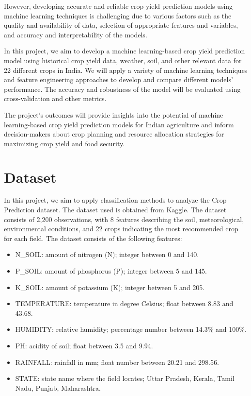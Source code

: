 \documentclass{article}
\begin{document}
However, developing accurate and reliable crop yield prediction models using machine learning techniques is challenging due to various factors such as the quality and availability of data, selection of appropriate features and variables, and accuracy and interpretability of the models.

In this project, we aim to develop a machine learning-based crop yield prediction model using historical crop yield data, weather, soil, and other relevant data for 22 different crops in India. We will apply a variety of machine learning techniques and feature engineering approaches to develop and compare different models' performance. The accuracy and robustness of the model will be evaluated using cross-validation and other metrics.

The project's outcomes will provide insights into the potential of machine learning-based crop yield prediction models for Indian agriculture and inform decision-makers about crop planning and resource allocation strategies for maximizing crop yield and food security.

\section{Dataset}

In this project, we aim to apply classification methods to analyze the Crop Prediction dataset. The dataset used is obtained from Kaggle. The dataset consists of 2,200 observations, with 8 features describing the soil, meteorological, environmental conditions, and 22 crops indicating the most recommended crop for each field. The dataset consists of the following features:

\begin{itemize}

\item N\_SOIL: amount of nitrogen (N); integer between 0 and 140.
\item P\_SOIL: amount of phosphorus (P); integer between 5 and 145.
\item K\_SOIL: amount of potassium (K); integer between 5 and 205.
\item TEMPERATURE: temperature in degree Celsius; float between 8.83 and 43.68.
\item HUMIDITY: relative humidity; percentage number between 14.3\% and 100\%.
\item PH: acidity of soil; float between 3.5 and 9.94.
\item RAINFALL: rainfall in mm; float number between 20.21 and 298.56.
\item STATE: state name where the field locates; Uttar Pradesh, Kerala, Tamil Nadu, Punjab, Maharashtra.

\end{itemize}
\end{document}
